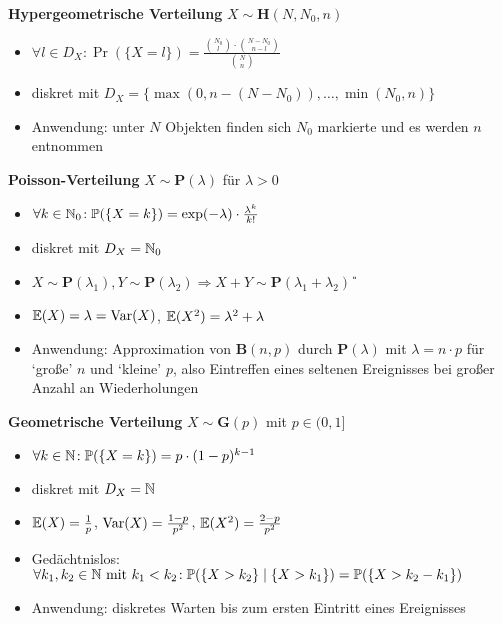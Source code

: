 \textbf{Hypergeometrische Verteilung} $X\sim\mathbf{H}(N,N_0,n)$
\begin{itemize}
\item $\forall l \in D_X\!: \Pr(\{X=l\})
  =\frac{\binom{N_0}{l} \cdot \binom{N-N_0}{n-l}}{\binom{N}{n}}$

\item diskret mit
  $D_X = \{\max(0,n-(N-N_0)),\ldots,\min(N_0,n)\}$

\item Anwendung: unter $N$ Objekten finden sich $N_0$ markierte und es werden
  $n$ entnommen
\end{itemize}

\textbf{Poisson-Verteilung} $X\sim\mathbf{P}(\lambda)$ für $\lambda > 0$
\begin{itemize}
\item $\forall k\in\mathbb{N}_0\!:
  \mathbb{P}(\{X=k\}) = \exp(-\lambda) \cdot \frac{\lambda^k}{k!}$

\item diskret mit $D_X = \mathbb{N}_0$

\item $X\sim\mathbf{P}(\lambda_1), Y\sim\mathbf{P}(\lambda_2)
  \Rightarrow X+Y\sim\mathbf{P}(\lambda_1 + \lambda_2)$ \U

\item $\mathbb{E}(X) = \lambda = \operatorname{Var}(X)$, $\mathbb{E}(X^2) = \lambda^2 + \lambda$

\item Anwendung: Approximation von $\mathbf{B}(n,p)$ durch $\mathbf{P}(\lambda)$
  mit $\lambda = n \cdot p$ für `große' $n$ und `kleine' $p$, also Eintreffen
  eines seltenen Ereignisses bei großer Anzahl an Wiederholungen
\end{itemize}

\newpage
\textbf{Geometrische Verteilung} $X\sim\mathbf{G}(p)$ mit $p \in (0,1]$
\begin{itemize}
\item $\forall k\in\mathbb{N}\!: \mathbb{P}(\{X=k\}) = p \cdot (1-p)^{k-1}$

\item diskret mit $D_X = \mathbb{N}$

\item $\mathbb{E}(X) = \frac{1}{p}$, $\operatorname{Var}(X) = \frac{1-p}{p^2}$,
  $\mathbb{E}(X^2) = \frac{2-p}{p^2}$

\item Gedächtnislos:\\ $\forall k_1,k_2\in\mathbb{N} \text{ mit } k_1 < k_2\!:
  \mathbb{P}(\{X > k_2\} \mid \{X > k_1\}) = \mathbb{P}(\{X > k_2 - k_1\})$

\item Anwendung: diskretes Warten bis zum ersten Eintritt eines Ereignisses
\end{itemize}

